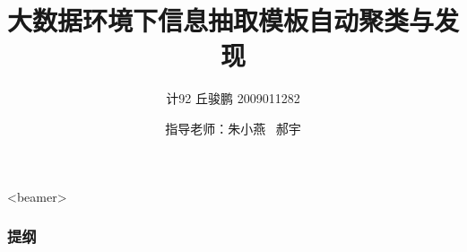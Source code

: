 \documentclass[presentation]{beamer}
\author{计92 丘骏鹏 2009011282}
\date{指导老师：朱小燕~ 郝宇}
\title{大数据环境下信息抽取模板自动聚类与发现}
\begin{document}
\maketitle
\begin{frame}<beamer>\frametitle{提纲}\tableofcontents\end{frame}




\end{document}
